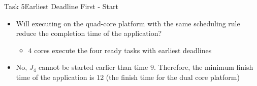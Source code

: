 \begin{frame}[allowframebreaks]{Task 5}{Earliest Deadline First - Start\vspace{0.5cm}}
  \begin{tasknoinc}
    \begin{itemize}
      \item Will executing on the \alert{quad-core platform} with the same scheduling rule reduce the completion time of the application?
        \begin{itemize}
          \item $4$ cores execute the four ready tasks with earliest deadlines
        \end{itemize}
    \end{itemize}
  \end{tasknoinc}
  \begin{solution}
    \begin{itemize}
      \item No, $J_4$ cannot be started earlier than time $9$. Therefore, the minimum finish time of the application is $12$ (the finish time for the dual core platform)
    \end{itemize}
  \end{solution}
\end{frame}
